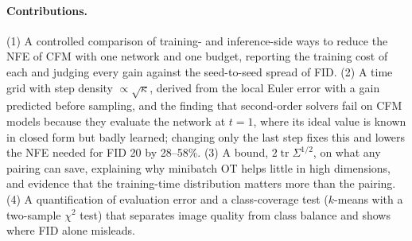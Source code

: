 \paragraph{Contributions.}
(1) A controlled comparison of training- and inference-side ways to reduce the NFE of CFM with one network and one budget, reporting the training cost of each and judging every gain against the seed-to-seed spread of FID.
(2) A time grid with step density $\propto\sqrt\kappa$, derived from the local Euler error with a gain predicted before sampling, and the finding that second-order solvers fail on CFM models because they evaluate the network at $t=1$, where its ideal value is known in closed form but badly learned; changing only the last step fixes this and lowers the NFE needed for FID 20 by 28--58\%.
(3) A bound, $2\operatorname{tr}\Sigma^{1/2}$, on what any pairing can save, explaining why minibatch OT helps little in high dimensions, and evidence that the training-time distribution matters more than the pairing.
(4) A quantification of evaluation error and a class-coverage test ($k$-means with a two-sample $\chi^2$ test) that separates image quality from class balance and shows where FID alone misleads.
